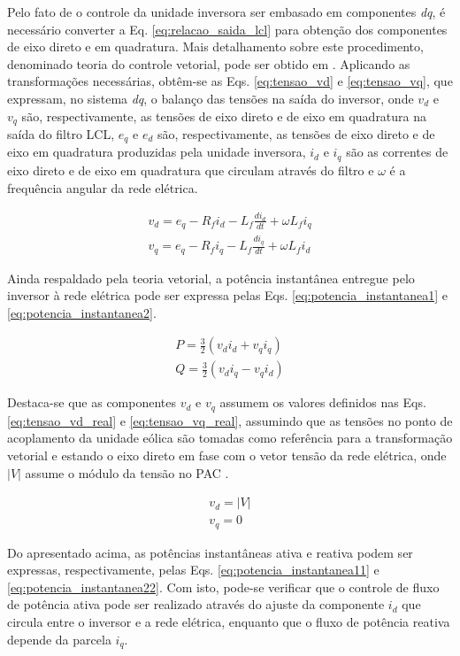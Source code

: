 Pelo fato de o controle da unidade inversora ser embasado em componentes \textit{dq}, é necessário converter a Eq. \ref{eq:relacao_saida_lcl} para obtenção dos componentes de eixo direto e em quadratura. Mais detalhamento sobre este procedimento, denominado teoria do controle vetorial, pode ser obtido em \cite{book-remusteodorescu201b1}. Aplicando as transformações necessárias, obtêm-se as Eqs. \ref{eq:tensao_vd} e \ref{eq:tensao_vq}, que expressam, no sistema \textit{dq}, o balanço das tensões na saída do inversor, onde $v_d$ e $v_q$ são, respectivamente, as tensões de eixo direto e de eixo em quadratura na saída do filtro LCL, $e_q$ e $e_d$ são, respectivamente, as tensões de eixo direto e de eixo em quadratura produzidas pela unidade inversora, $i_d$ e $i_q$ são as correntes de eixo direto e de eixo em quadratura que circulam através do filtro e $\omega$ é a frequência angular da rede elétrica.

\begin{align}
	v_d = e_q - R_fi_d - L_f \frac{di_d}{dt} + \omega L_fi_q\label{eq:tensao_vd}\\
	v_q = e_q - R_fi_q - L_f\frac{di_q}{dt} + \omega L_fi_d\label{eq:tensao_vq}
\end{align}

Ainda respaldado pela teoria vetorial, a potência instantânea entregue pelo inversor à rede elétrica pode ser expressa pelas Eqs. \ref{eq:potencia_instantanea1} e \ref{eq:potencia_instantanea2}. 

\begin{align}
	P = \frac{3}{2}(v_di_d + v_qi_q)\label{eq:potencia_instantanea1}\\
	Q = \frac{3}{2}(v_di_q - v_qi_d)\label{eq:potencia_instantanea2}
\end{align}

Destaca-se que as componentes $v_d$ e $v_q$ assumem os valores definidos nas Eqs. \ref{eq:tensao_vd_real} e \ref{eq:tensao_vq_real}, assumindo que as tensões no ponto de acoplamento da unidade eólica são tomadas como referência para a transformação vetorial e estando o eixo direto em fase com o vetor tensão da rede elétrica, onde $|V|$ assume o módulo da tensão no PAC \cite{TeseProfAlex}. 

\begin{align}
	v_d = |V|\label{eq:tensao_vd_real}\\
	v_q = 0\label{eq:tensao_vq_real}
\end{align}

Do apresentado acima, as potências instantâneas ativa e reativa podem ser expressas, respectivamente, pelas Eqs. \ref{eq:potencia_instantanea11} e \ref{eq:potencia_instantanea22}. Com isto, pode-se verificar que o controle de fluxo de potência ativa pode ser realizado através do ajuste da componente $i_d$ que circula entre o inversor e a rede elétrica, enquanto que o fluxo de potência reativa depende da parcela $i_q$.

